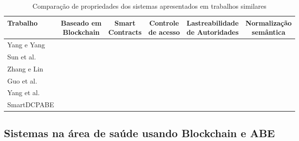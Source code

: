 \documentclass[a4paper,11pt]{article}
\newcommand{\cmark}{\ding{51}}
\newcommand{\xmark}{\ding{55}}
\begin{document}
\begin{table}[h]
  \begin{center}
    \begin{adjustbox}{width=1\textwidth}
    \begin{tabular}{lccccc}
      \hline
      Trabalho & \makecell{Baseado em\\Blockchain} & \makecell{Smart\\Contracts} & \makecell{Controle\\de acesso} & \makecell{Lastreabilidade\\de Autoridades} & \makecell{Normalização\\semântica} \\
      \hline
      Yang e Yang \cite{Yang2017} & \cmark & \cmark & \cmark & \xmark & \xmark\\
      Sun et al. \cite{Sun2018} & \cmark & \xmark & \xmark & \xmark & \xmark \\
      Zhang e Lin \cite{Zhang2018} & \cmark & \xmark & \cmark & \xmark & \cmark\\
      Guo et al. \cite{Guo2020} & \cmark & \cmark & \cmark & \xmark & \xmark\\
      Yang et al. \cite{Yang2020} & \cmark & \xmark & \cmark & \xmark & \xmark\\
      SmartDCPABE & \cmark & \cmark & \cmark & \cmark & \cmark \\
      \hline
    \end{tabular}
  \end{adjustbox}
  \caption{Comparação de propriedades dos sistemas apresentados em trabalhos similares}
  \label{tbl:comparacao-entre-trabalhos}
\end{center}
\end{table}

\subsection{Sistemas na área de saúde usando Blockchain e ABE}
\label{sec:sub:saude-blockchain-cba}
\end{document}
